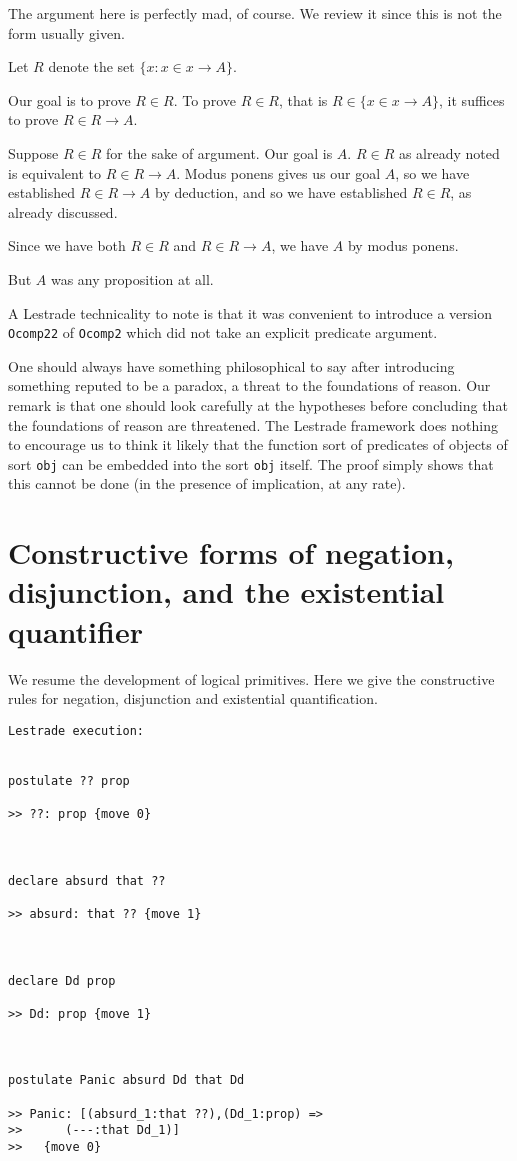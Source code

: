 \documentclass[12pt]{article}
\begin{document}
The argument here is perfectly mad, of course.  We review it since this is not the form usually given.

Let $R$ denote the set $\{x:x \in x \rightarrow A\}$.

Our goal is to prove $R \in R$.  To prove $R \in R$, that is $R \in \{x \in x \rightarrow A\}$, it suffices to prove $R \in R \rightarrow A$.

Suppose $R \in R$ for the sake of argument.  Our goal is $A$.  $R \in R$ as already noted is equivalent to $R \in R \rightarrow A$.
Modus ponens gives us our goal $A$, so we have established $R \in R \rightarrow A$ by deduction, and so we have established $R \in R$,
as already discussed.

Since we have both $R \in R$ and $R \in R \rightarrow A$, we have $A$ by modus ponens.

But $A$ was any proposition at all.

A Lestrade technicality to note is that it was convenient to introduce a version {\tt Ocomp22} of {\tt Ocomp2}  which did not take an explicit predicate argument.

One should always have something philosophical to say after introducing something reputed to be a paradox, a threat to the foundations of reason.  Our remark is that one should look carefully at the hypotheses before concluding that the foundations of reason are threatened.  The Lestrade framework does nothing to encourage us to think it likely that the function sort of predicates of objects of sort {\tt obj} can be embedded into the sort {\tt obj} itself.  The proof simply shows that this cannot be done (in the presence of implication, at any rate).

\section{Constructive forms of negation, disjunction, and the existential quantifier}

We resume the development of logical primitives.  Here we give the constructive rules for negation, disjunction and existential quantification.

\begin{verbatim}Lestrade execution:


postulate ?? prop

>> ??: prop {move 0}



declare absurd that ??

>> absurd: that ?? {move 1}



declare Dd prop

>> Dd: prop {move 1}



postulate Panic absurd Dd that Dd

>> Panic: [(absurd_1:that ??),(Dd_1:prop) =>
>>      (---:that Dd_1)]
>>   {move 0}


\end{verbatim}
\end{document}
